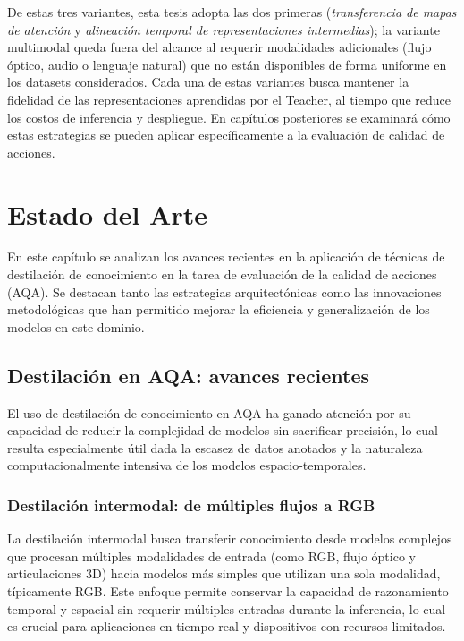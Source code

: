 De estas tres variantes, esta tesis adopta las dos primeras (\textit{transferencia de mapas de atención} y \textit{alineación temporal de representaciones intermedias}); la variante multimodal queda fuera del alcance al requerir modalidades adicionales (flujo óptico, audio o lenguaje natural) que no están disponibles de forma uniforme en los datasets considerados. Cada una de estas variantes busca mantener la fidelidad de las representaciones aprendidas por el Teacher, al tiempo que reduce los costos de inferencia y despliegue. En capítulos posteriores se examinará cómo estas estrategias se pueden aplicar específicamente a la evaluación de calidad de acciones.

\chapter{Estado del Arte}\label{chap:sota}

En este capítulo se analizan los avances recientes en la aplicación de técnicas de destilación de conocimiento en la tarea de evaluación de la calidad de acciones (\ac{AQA}). Se destacan tanto las estrategias arquitectónicas como las innovaciones metodológicas que han permitido mejorar la eficiencia y generalización de los modelos en este dominio.

\section{Destilación en AQA: avances recientes}

El uso de destilación de conocimiento en AQA ha ganado atención por su capacidad de reducir la complejidad de modelos sin sacrificar precisión, lo cual resulta especialmente útil dada la escasez de datos anotados y la naturaleza computacionalmente intensiva de los modelos espacio-temporales.

\subsection{Destilación intermodal: de múltiples flujos a RGB}

La destilación intermodal busca transferir conocimiento desde modelos complejos que procesan múltiples modalidades de entrada (como RGB, flujo óptico y articulaciones 3D) hacia modelos más simples que utilizan una sola modalidad, típicamente RGB. Este enfoque permite conservar la capacidad de razonamiento temporal y espacial sin requerir múltiples entradas durante la inferencia, lo cual es crucial para aplicaciones en tiempo real y dispositivos con recursos limitados.

